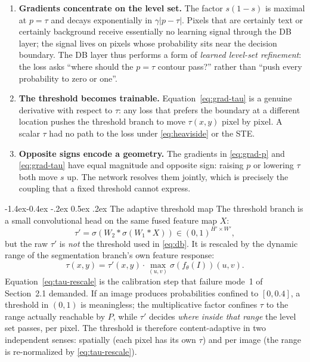 \documentclass[11pt,a4paper]{article}
\makeatletter
\renewcommand\subsection{\@startsection{subsection}{2}{\z@}%
                                     {-1.4ex\@plus -0.4ex \@minus -.2ex}%
                                     {0.5ex \@plus .2ex}%
                                     {\normalfont\normalsize\bfseries}}
\newcommand{\1}{\mathbf{1}}
\makeatother
\begin{document}
\begin{enumerate}
    \item \textbf{Gradients concentrate on the level set.} The factor $s(1-s)$ is maximal at $p = \tau$ and decays exponentially in $\gamma |p - \tau|$. Pixels that are certainly text or certainly background receive essentially no learning signal through the DB layer; the signal lives on pixels whose probability sits near the decision boundary. The DB layer thus performs a form of \emph{learned level-set refinement}: the loss asks ``where should the $p = \tau$ contour pass?'' rather than ``push every probability to zero or one''.
    \item \textbf{The threshold becomes trainable.} Equation~\eqref{eq:grad-tau} is a genuine derivative with respect to $\tau$: any loss that prefers the boundary at a different location pushes the threshold branch to move $\tau(x,y)$ pixel by pixel. A scalar $\tau$ had no path to the loss under \eqref{eq:heaviside} or the STE.
    \item \textbf{Opposite signs encode a geometry.} The gradients in \eqref{eq:grad-p} and \eqref{eq:grad-tau} have equal magnitude and opposite sign: raising $p$ or lowering $\tau$ both move $s$ up. The network resolves them jointly, which is precisely the coupling that a fixed threshold cannot express.
\end{enumerate}

\subsection{The adaptive threshold map}
The threshold branch is a small convolutional head on the same fused feature map $X$:
\[
\tau' = \sigma\!\left( W_2 * \sigma\!\left( W_1 * X \right) \right) \in (0,1)^{H' \times W'},
\]
but the raw $\tau'$ is \emph{not} the threshold used in \eqref{eq:db}. It is rescaled by the dynamic range of the segmentation branch's own feature response:
\begin{equation}
\tau(x,y) = \tau'(x,y) \cdot \max_{(u,v)} \sigma\!\left(f_\theta(I)\right)(u,v).
\label{eq:tau-rescale}
\end{equation}
Equation~\eqref{eq:tau-rescale} is the calibration step that failure mode~1 of Section~2.1 demanded. If an image produces probabilities confined to $[0, 0.4]$, a threshold in $(0,1)$ is meaningless; the multiplicative factor confines $\tau$ to the range actually reachable by $P$, while $\tau'$ decides \emph{where inside that range} the level set passes, per pixel. The threshold is therefore content-adaptive in two independent senses: spatially (each pixel has its own $\tau$) and per image (the range is re-normalized by \eqref{eq:tau-rescale}).
\end{document}
